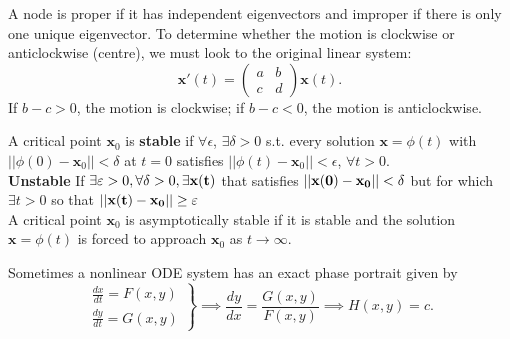 \documentclass[10pt,landscape]{article}
\newcommand{\mbf}{\mathbf}
\newcommand{\f}{\frac}
\begin{document}
\begin{multicols}{2}
A node is proper if it has independent eigenvectors and improper if there is only one unique eigenvector.
To determine whether the motion is clockwise or anticlockwise (centre), we must look to the original linear system:\\
\[
\mathbf{x}'(t) = \begin{pmatrix} a & b \\ c & d \end{pmatrix} \mathbf{x}(t).
\]
If \( b - c > 0 \), the motion is clockwise; if \( b - c < 0 \), the motion is anticlockwise.

	 A critical point $\mbf{x}_0$ is \textbf{stable} if $\forall \epsilon$, $\exists \delta>0$ s.t. every solution $\mbf{x} = \phi(t)$ with $||\phi(0)-\mbf{x}_0|| < \delta$ at $t=0$ satisfies $||\phi(t)-\mbf{x}_0|| < \epsilon$, $\forall t >0$.\\

     \textbf{Unstable} If $\exists \varepsilon>0 , \forall \delta>0 , \exists \bf{x}(t)$ that satisfies $||\bf{x}(0)-\bf{x}_0|| < \delta$ but for which $\exists t>0$ so that $||\bf{x}(t)-\bf{x}_0||\ge \varepsilon$\\
     \vspace{0.1cm}
	 A critical point $\mbf{x}_0$ is asymptotically stable if it is stable and the solution $\mbf{x} = \phi(t)$ is forced to approach $\mbf{x}_0$ as $t \rightarrow \infty$.
 
	Sometimes a nonlinear ODE system has an exact phase portrait given by \\
 	\vspace{-0.1cm}
  	$$ \left. \begin{array}{ll}
		\f{dx}{dt} = F(x,y) \\ \f{dy}{dt} = G(x,y)
                \end{array}
              \right\} \implies \f{dy}{dx} = \f{G(x,y)}{F(x,y)} \implies H(x,y) = c. $$


\end{multicols}
\end{document}
